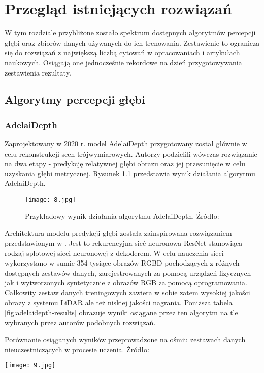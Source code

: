\chapter{Przegląd istniejących rozwiązań}\label{chap:3_przegląd_istniejących_rozwiązań}

W tym rozdziale przybliżone zostało spektrum dostępnych algorytmów percepcji głębi oraz zbiorów danych używanych do ich trenowania. Zestawienie to ogranicza się do rozwiązań z największą liczbą cytowań w opracowaniach i artykułach naukowych. Osiągają one jednocześnie rekordowe na dzień przygotowywania zestawienia rezultaty.

\section{Algorytmy percepcji głębi}
\subsection{AdelaiDepth}
Zaprojektowany w 2020 r. model AdelaiDepth \cite{yin2020} przygotowany został głównie w celu rekonstrukcji scen trójwymiarowych. Autorzy podzielili wówczas rozwiązanie na dwa etapy - predykcję relatywnej głębi obrazu oraz jej przesunięcie w celu uzyskania głębi metrycznej. Rysunek \ref{fig:adelaidepth} przedstawia wynik działania algorytmu AdelaiDepth.
\begin{figure}[H]
    \centering
    \texttt{[image: 8.jpg]}
    \caption{Przykładowy wynik działania algorytmu AdelaiDepth. Źródło: \cite{yin2020}}
    \label{fig:adelaidepth}
\end{figure}
Architektura modelu predykcji głębi została zainspirowana rozwiązaniem przedstawionym w \cite{xian2020}. Jest to rekurencyjna sieć neuronowa ResNet \cite{he2015} stanowiąca rodzaj splotowej sieci neuronowej z dekoderem. W celu nauczenia sieci wykorzystano w sumie 354 tysiące obrazów RGBD pochodzących z różnych dostępnych zestawów danych, zarejestrowanych za pomocą urządzeń fizycznych jak i wytworzonych syntetycznie z obrazów RGB za pomocą oprogramowania. Całkowity zestaw danych treningowych zawiera w sobie zatem  wysokiej jakości obrazy z systemu LiDAR ale też niskiej jakości nagrania. Poniższa tabela \ref{fig:adelaidepth-results} obrazuje wyniki osiągane przez ten algorytm na tle wybranych przez autorów podobnych rozwiązań.
\begin{table}[H]
    \centering
    \caption{Porównanie osiąganych wyników przeprowadzone na ośmiu zestawach danych nieuczestniczących w procesie uczenia. Źródło: \cite{yin2020}}
    \texttt{[image: 9.jpg]}
    \label{fig:adelaidepth-results}
\end{table}

